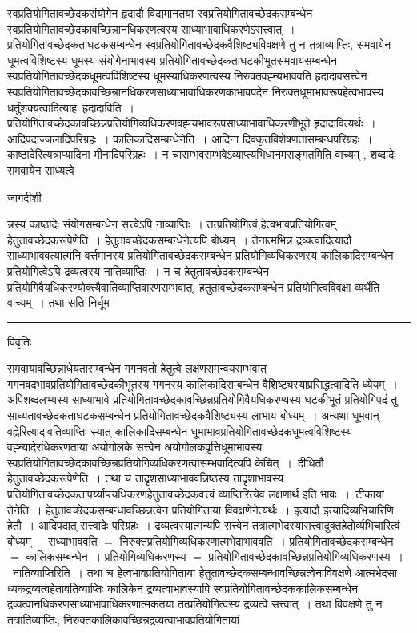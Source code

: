 \documentclass[10pt, openany]{book}
\begin{document}
{स्वप्रतियोगितावच्छेदकसंयोगेन हृदादौ विद्यमानतया स्वप्रतियोगितावच्छेदकसम्बन्धेन स्वप्रतियोगितावच्छेदकावच्छिन्नानधिकरणत्वस्य साध्याभावाधिकरणेऽसत्त्वात्~। प्रतियोगितावच्छेदकताघटकसम्बन्धेन स्वप्रतियोगितावच्छेदकवैशिष्ट्यविवक्षणे तु न तत्राव्याप्तिः, समवायेन धूमत्वविशिष्टस्य धूमस्य संयोगेनाभावस्य
प्रतियोगितावच्छेदकताघटकीभूतसमवायसम्बन्धेन स्वप्रतियोगितावच्छेदकधूमत्वविशिष्टस्य धूमस्याधिकरणत्वस्य निरुक्तवह्न्यभाववति हृदादावसत्त्वेन
स्वप्रतियोगितावच्छेदकावच्छिन्नानधिकरणसाध्याभावाधिकरणकाभावपदेन निरुक्तधूमाभावरूपहेत्वभावस्य धर्तुंशक्यत्वादित्याह\textendash\ {\la ह्रदादाविति~।}
प्रतियोगितावच्छेदकावच्छिन्नप्रतियोगिव्यधिकरणवह्न्यभावरूपसाध्याभावाधिकरणीभूते हृदादावित्यर्थः~। आदिपदाज्जलादिपरिग्रहः~। कालिकादिसम्बन्धेनेति~। आदिना दिक्कृतविशेषणतासम्बन्धपरिग्रहः~। काष्ठादेरित्यत्राप्यादिना {\la मीनादिपरिग्रहः~}। न चासम्भवसम्भवेऽव्याप्त्यभिधानमसङ्गतमिति वाच्यम् , शब्दादेः समवायेन साध्यत्वे
\newpage
\begin{center} जागदीशी \end{center}
{\la न्नस्य काष्ठादेः संयोगसम्बन्धेन सत्त्वेऽपि नाव्याप्तिः~। तत्प्रतियोगित्वं,हेत्वभावप्रतियोगित्वम्~। हेतुतावच्छेदकरूपेणेति~। हेतुतावच्छेदकसम्बन्धेनेत्यपि बोध्यम्~। तेनात्मभिन्न द्रव्यत्वादित्यादौ साध्याभाववत्यात्मनि वर्त्तमानस्य प्रतियोगितावच्छेदकसम्बन्धेन प्रतियोगिव्यधिकरणस्य कालिकादिसम्बन्धेन प्रतियोगित्वेऽपि द्रव्यत्वस्य नातिव्याप्तिः~। न च हेतुतावच्छेदकसम्बन्धेन प्रतियोगिवैयधिकरण्योक्त्यैवातिव्याप्तिवारणसम्भवात्, हतुतावच्छेदकसम्बन्धेन प्रतियोगित्वविवक्षा व्यर्थेति वाच्यम्~। तथा सति निर्धूम}\\
\hrule
\begin{center}     विवृतिः \end{center}
समवायावच्छिन्नाधेयतासम्बन्धेन गगनवतो हेतुत्वे लक्षणसमन्वयसम्भवात् गगनवदभावप्रतियोगितावच्छेदकीभूतस्य गगनस्य कालिकादिसम्बन्धेन वैशिष्ट्यस्याप्रसिद्धत्वादिति ध्येयम्~। अपिशब्दलभ्यस्य साध्याभावे प्रतियोगितावच्छेदकावच्छिन्नप्रतियोगिवैयधिकरण्यस्य घटकीभूतं प्रतियोगिपदं तु साध्यतावच्छेदकताघटकसम्बन्धेन प्रतियोगितावच्छेदकवैशिष्ट्यस्य लाभाय बोध्यम्~। अन्यथा धूमवान् वह्नेरित्यादावतिव्याप्तिः स्यात् कालिकादिसम्बन्धेन धूमाभावप्रतियोगितावच्छेदकधूमत्वविशिष्टस्य वह्न्यादेरधिकरणताया अयोगोलके सत्त्वेन अयोगोलकवृत्तिधूमाभावस्य स्वप्रतियोगितावच्छेदकावच्छिन्नप्रतियोगिव्यधिकरणत्वासम्भवादित्यपि केचित्~।~दीधितौ  {\la हेतुतावच्छेदकरूपेणेति~।} तथा च तादृशसाध्याभाववन्निष्ठस्य तादृशाभावस्य प्रतियोगितावच्छेदकतापर्य्याप्त्यधिकरणहेतुतावच्छेदकवत्त्वं व्याप्तिरित्येव लक्षणार्थ इति भावः~।~टीकायां {\la तेनेति~।} हेतुतावच्छेदकसम्बन्धावच्छिन्नत्वेन प्रतियोगिताया विवक्षणेनेत्यर्थः~। इत्यादौ \textendash  इत्यादिव्यभिचारिणि हेतौ~। आदिपदात् सत्त्वादेः परिग्रहः~। द्रव्यत्वस्यात्मन्यपि सत्त्वेन तत्रात्मभेदस्यासत्त्वादुक्तहेतोर्व्यभिचारित्वं बोध्यम्~। सध्याभाववति $=$ निरुक्तप्रतियोगिव्यधिकरणात्मभेदाभाववति~। प्रतियोगितावच्छेदकसम्बन्धेन  $=$ कालिकसम्बन्धेन~। प्रतियोगिव्यधिकरणस्य $=$ प्रतियोगितावच्छेदकावच्छिन्नप्रतियोगिव्यधिकरणस्य~।~{\la नातिव्याप्तिरिति~।} तथा च हेत्वभावप्रतियोगिताया हेतुतावच्छेदकसम्बन्धावच्छिन्नत्वेनाविवक्षणे आत्मभेदसा  ध्यकद्रव्यत्वहेतावतिव्याप्तिः कालिकेन द्रव्यत्वाभावस्यापि स्वप्रतियोगितावच्छेदककालिकसम्बन्धेन द्रव्यत्वानधिकरणसाध्याभावाधिकरणात्मकतया तत्प्रतियोगित्वस्य द्रव्यत्वे सत्त्वात्~। तथा विवक्षणे तु न तत्रातिव्याप्तिः, निरुक्तकालिकावच्छिन्नद्रव्यत्वाभावप्रतियोगितायां
}
\end{document}
